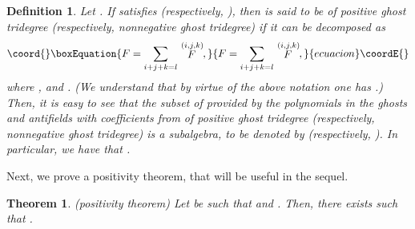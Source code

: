 \documentclass[a4paper,12pt]{article}
\newtheorem{theorem}{Theorem}
\newtheorem{definition}{Definition}
\begin{document}
\begin{definition}
Let \coordHE{}. If \coordHE{} satisfies \coordHE{}
(respectively, \coordHE{}), then \coordHE{} is said to
be of positive ghost tridegree (respectively, nonnegative ghost tridegree)
if it can be decomposed as 
\begin{equation}\coord{}\boxEquation{
F=\sum\limits_{i+j+k=l}\stackrel{(i,j,k)}{F},  \label{sp3.74}
}{
F=\sum\limits_{i+j+k=l}\stackrel{(i,j,k)}{F},  }{ecuacion}\coordE{}\end{equation}
where \coordHE{}, \coordHE{} and \coordHE{}. (We understand that by virtue of
the above notation one has \coordHE{}.) Then, it is easy to see that the subset of \coordHE{}
provided by the polynomials in the ghosts and antifields with coefficients
from \coordHE{} of positive ghost tridegree
(respectively, nonnegative ghost tridegree) is a subalgebra, to be denoted
by \coordHE{} (respectively, \coordHE{}). In particular, we
have that \coordHE{}.
\end{definition}

Next, we prove a positivity theorem, that will be useful in the sequel.

\begin{theorem}
(positivity theorem) Let \coordHE{} be such that \coordHE{} and \coordHE{}. Then, there exists \coordHE{} such that \coordHE{}.
\end{theorem}
\end{document}
